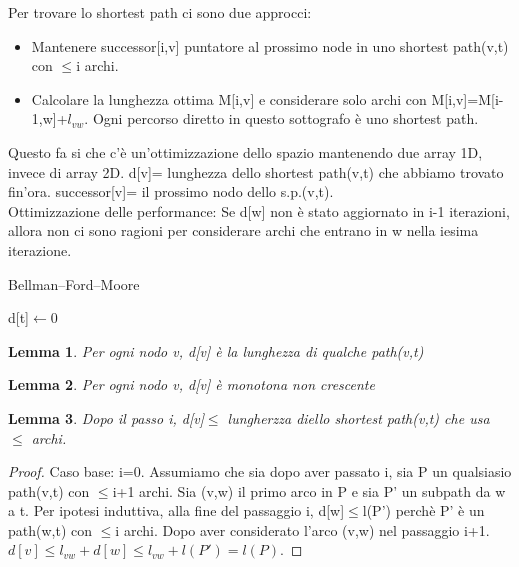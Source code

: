 \documentclass{article}
\newtheorem{lemma}{Lemma}[subsection]
\begin{document}
Per trovare lo shortest path ci sono due approcci:
\begin{itemize}
    \item Mantenere successor[i,v] puntatore al prossimo node in uno shortest path(v,t) con $\leq$i archi.
    \item Calcolare la lunghezza ottima M[i,v] e considerare solo archi con M[i,v]=M[i-1,w]+$l_{vw}$. Ogni percorso diretto in questo sottografo è uno shortest path.
\end{itemize}
Questo fa si che c'è un'ottimizzazione dello spazio mantenendo due array 1D, invece di array 2D. d[v]= lunghezza dello shortest path(v,t) che abbiamo trovato fin'ora. successor[v]= il prossimo nodo dello s.p.(v,t).\\ Ottimizzazione delle performance: Se d[w] non è stato aggiornato in i-1 iterazioni, allora non ci sono ragioni per considerare archi che entrano in w nella iesima iterazione.
\newpage
\begin{center}
\begin{algorithm}
\caption{Bellman–Ford–Moore}
d[t]$\leftarrow0\;$
\end{algorithm}
\end{center}
\begin{lemma}
    Per ogni nodo v, d[v] è la lunghezza di qualche path(v,t)
\end{lemma}
\begin{lemma}
    Per ogni nodo v, d[v] è monotona non crescente
\end{lemma}
\begin{lemma}
    Dopo il passo i, d[v]$\leq$ lungherzza diello shortest path(v,t) che usa $\leq$ archi.
\end{lemma}
\begin{proof}
    Caso base: i=0. Assumiamo che sia dopo aver passato i, sia P un qualsiasio path(v,t) con $\leq$i+1 archi. Sia (v,w) il primo arco in P e sia P' un subpath da w a t. Per ipotesi induttiva, alla fine del passaggio i, d[w]$\leq$l(P') perchè P' è un path(w,t) con $\leq$i archi. Dopo aver considerato l'arco (v,w) nel passaggio i+1. $d[v]\leq l_{vw}+d[w] \leq l_{vw}+l(P')=l(P)$.
\end{proof}
\end{document}

